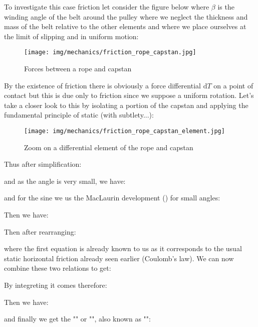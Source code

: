 	To investigate this case friction let consider the figure below where $\beta$ is the winding angle of the belt around the pulley where we neglect the thickness and mass of the belt relative to the other elements and where we place ourselves at the limit of slipping and in uniform motion:
	\begin{figure}[H]
		\centering
		\texttt{[image: img/mechanics/friction\_rope\_capstan.jpg]}
		\caption{Forces between a rope and capstan}
	\end{figure}
	By the existence of friction there is obviously a force differential $\mathrm{d}T$ on a point of contact but this is due only to friction since we suppose a uniform rotation. Let's take a closer look to this by isolating a portion of the capstan and applying the fundamental principle of static (with subtlety...):
	\begin{figure}[H]
		\centering
		\texttt{[image: img/mechanics/friction\_rope\_capstan\_element.jpg]}
		\caption[]{Zoom on a differential element of the rope and capstan}
	\end{figure}
	
	Thus after simplification:
	
	and as the angle is very small, we have:
	
	and for the sine we us the MacLaurin development () for small angles:
	
	Then we have:
	
		Then after rearranging:
	
	where the first equation is already known to us as it corresponds to the usual static horizontal friction already seen earlier (Coulomb's law). We can now combine these two relations to get:
	
	By integreting it comes therefore:
	
	Then we have:
	
	and finally we get the "" or "", also known as "":
	
